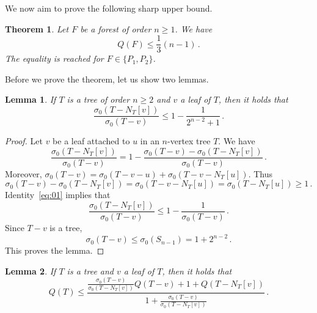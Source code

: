 \documentclass[a4paper,12pt]{amsart}
\newtheorem{thm}{Theorem}
\newtheorem{lem}{Lemma}
\begin{document}
We now aim to prove the following sharp upper bound.
	\begin{thm}\label{MaxForest}
		Let $F$ be a forest of order $n\geq 1$. We have
        \begin{equation*}
			Q(F)\leq \frac{1}{3}\left(n-1\right)\,.
		\end{equation*}
The equality is reached for $F\in \{P_1,P_2\}$.
	\end{thm}
    
\medskip
    Before we prove the theorem, let us show two lemmas.
    
	\begin{lem}\label{Lem:1}
		If $T$ is a tree of order $n\geq 2$  and $v$ a leaf of $T$, then it holds that
		\begin{equation*}
			\frac{\sigma_0\left(T-N_T[v]\right)}{\sigma_0\left(T-v\right)}\leq 1-\frac{1}{2^{n-2}+1}\,.
		\end{equation*}
	\end{lem}
    
	\begin{proof}
		Let $v$ be a leaf attached to $u$ in an $n$-vertex tree $T$. We have
		\begin{equation}
			\frac{\sigma_0\left(T-N_T[v]\right)}{\sigma_0\left(T-v\right)} =1-\frac{\sigma_0\left(T-v\right)-\sigma_0\left(T-N_T[v]\right)}{\sigma_0\left(T-v\right)}\,. \label{eq:01}
		\end{equation}
		Moreover, $\sigma_0(T-v)=\sigma_0\left(T-v-u\right) + \sigma_0\left(T-v-N_T[u]\right)$. %
        Thus
		\begin{equation*}
			\sigma_0(T-v)-\sigma_0\left(T-N_T[v]\right)=\sigma_0\left(T-v-N_T[u]\right) = \sigma_0\left(T-N_T[u]\right)\geq 1\,.
		\end{equation*}
		Identity~\eqref{eq:01} implies that $$\frac{\sigma_0\left(T-N_T[v]\right)}{\sigma_0\left(T-v\right)} \leq 1-\frac{1}{\sigma_0\left(T-v\right)}\,.$$
		Since $T-v$ is a tree,
        $$\sigma_0\left(T-v\right)\leq \sigma_0\left(S_{n-1}\right)=1+2^{n-2}\,.$$ This proves the lemma.
	\end{proof}

    \medskip
	\begin{lem}\label{Lem:2}
		If $T$ is a tree and $v$ a leaf of $T$, then it holds that
		\begin{equation*}
			Q(T)\leq \frac{\displaystyle\frac{\sigma_0\left(T-v\right)}{\sigma_0\left(T-N_T[v]\right)}Q(T-v)+1+Q\left(T-N_T[v]\right)}{1+\displaystyle\frac{\sigma_0\left(T-v\right)}{\sigma_0\left(T-N_T[v]\right)}}\,.
		\end{equation*}
	\end{lem}
    
\end{document}
